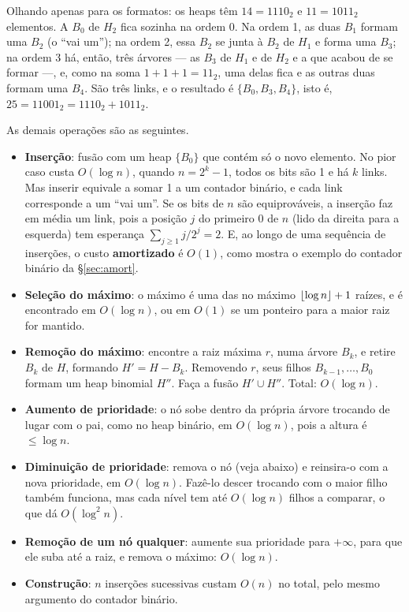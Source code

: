\begin{exemplo}[{Fusão de $H_1=\{B_1,B_2,B_3\}$ com $H_2=\{B_0,B_1,B_3\}$}]\label{ex:fusaoformas}
Olhando apenas para os formatos: os heaps têm $14=1110_2$ e $11=1011_2$ elementos. A $B_0$ de $H_2$ fica sozinha na ordem 0. Na ordem 1, as duas $B_1$ formam uma $B_2$ (o ``vai um''); na ordem 2, essa $B_2$ se junta à $B_2$ de $H_1$ e forma uma $B_3$; na ordem 3 há, então, três árvores --- as $B_3$ de $H_1$ e de $H_2$ e a que acabou de se formar ---, e, como na soma $1+1+1=11_2$, uma delas fica e as outras duas formam uma $B_4$. São três links, e o resultado é $\{B_0,B_3,B_4\}$, isto é, $25=11001_2=1110_2+1011_2$.
\end{exemplo}

As demais operações são as seguintes.
\begin{itemize}
  \item \textbf{Inserção}: fusão com um heap $\{B_0\}$ que contém só o novo elemento. No pior caso custa $O(\log n)$, quando $n=2^k-1$, todos os bits são 1 e há $k$ links. Mas inserir equivale a somar 1 a um contador binário, e cada link corresponde a um ``vai um''. Se os bits de $n$ são equiprováveis, a inserção faz em média um link, pois a posição $j$ do primeiro 0 de $n$ (lido da direita para a esquerda) tem esperança $\sum_{j\ge1}j/2^j=2$. E, ao longo de uma sequência de inserções, o custo \textbf{amortizado} é $O(1)$, como mostra o exemplo do contador binário da §\ref{sec:amort}.
  \item \textbf{Seleção do máximo}: o máximo é uma das no máximo $\lfloor\log n\rfloor+1$ raízes, e é encontrado em $O(\log n)$, ou em $O(1)$ se um ponteiro para a maior raiz for mantido.
  \item \textbf{Remoção do máximo}: encontre a raiz máxima $r$, numa árvore $B_k$, e retire $B_k$ de $H$, formando $H'=H-B_k$. Removendo $r$, seus filhos $B_{k-1},\dots,B_0$ formam um heap binomial $H''$. Faça a fusão $H'\cup H''$. Total: $O(\log n)$.
  \item \textbf{Aumento de prioridade}: o nó sobe dentro da própria árvore trocando de lugar com o pai, como no heap binário, em $O(\log n)$, pois a altura é $\le\log n$.
  \item \textbf{Diminuição de prioridade}: remova o nó (veja abaixo) e reinsira-o com a nova prioridade, em $O(\log n)$. Fazê-lo descer trocando com o maior filho também funciona, mas cada nível tem até $O(\log n)$ filhos a comparar, o que dá $O(\log^2n)$.
  \item \textbf{Remoção de um nó qualquer}: aumente sua prioridade para $+\infty$, para que ele suba até a raiz, e remova o máximo: $O(\log n)$.
  \item \textbf{Construção}: $n$ inserções sucessivas custam $O(n)$ no total, pelo mesmo argumento do contador binário.
\end{itemize}

